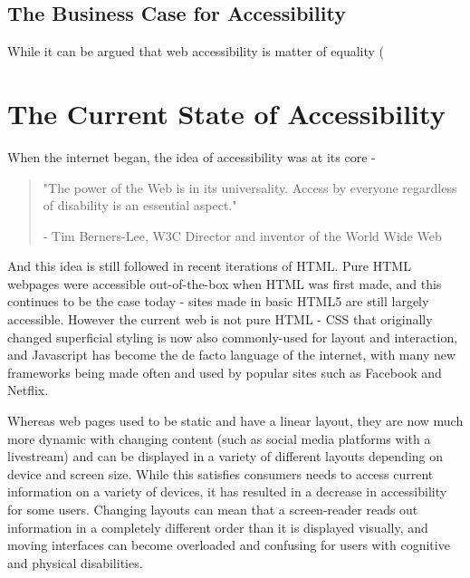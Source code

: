 \documentclass{article}
\begin{document}
\subsection{The Business Case for Accessibility}

While it can be argued that web accessibility is matter of equality (






\section{The Current State of Accessibility}

When the internet began, the idea of accessibility was at its core - 

\begin{quote} 
\centering 
"The power of the Web is in its universality. Access by everyone regardless of disability is an essential aspect."

- Tim Berners-Lee, W3C Director and inventor of the World Wide Web
\end{quote}
%
And this idea is still followed in recent iterations of HTML. Pure HTML webpages were accessible out-of-the-box when HTML was first made, and this continues to be the case today - sites made in basic HTML5 are still largely accessible. However the current web is not pure HTML - CSS that originally changed superficial styling is now also commonly-used for layout and interaction, and Javascript has become the de facto language of the internet, with many new frameworks being made often and used by popular sites such as Facebook and Netflix.

Whereas web pages used to be static and have a linear layout, they are now much more dynamic with changing content (such as social media platforms with a livestream) and can be displayed in a variety of different layouts depending on device and screen size. While this satisfies consumers needs to access current information on a variety of devices, it has resulted in a decrease in accessibility for some users. Changing layouts can mean that a screen-reader reads out information in a completely different order than it is displayed visually, and moving interfaces can become overloaded and confusing for users with cognitive and physical disabilities.
\end{document}
